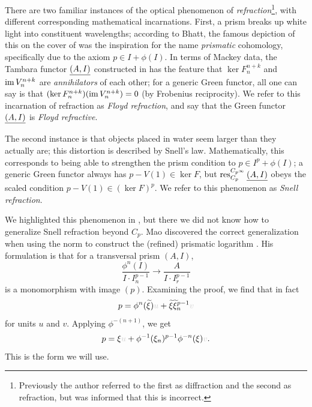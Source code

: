 \begin{remark}[Refraction]
  \label{rmk:snell}
  There are two familiar instances of the optical phenomenon of \emph{refraction}\footnote{Previously the author referred to the first as diffraction and the second as refraction, but was informed that this is incorrect.}, with different corresponding mathematical incarnations. First, a prism breaks up white light into constituent wavelengths; according to Bhatt, the famous depiction of this on the cover of \cite{DarkSideMoon} was the inspiration for the name \emph{prismatic} cohomology, specifically due to the axiom $p \in I + \phi(I)$. In terms of Mackey data, the Tambara functor $\underline{(A, I)}$ constructed in \cite{PrismsTambara1} has the feature that $\ker F^{n+k}_n$ and $\operatorname{im} V^{n+k}_n$ are \emph{annihilators} of each other; for a generic Green functor, all one can say is that $(\ker F^{n+k}_n)(\operatorname{im} V^{n+k}_n) = 0$ (by Frobenius reciprocity). We refer to this incarnation of refraction as \emph{Floyd refraction}, and say that the Green functor $\underline{(A, I)}$ is \emph{Floyd refractive}.

  The second instance is that objects placed in water seem larger than they actually are; this distortion is described by Snell's law. Mathematically, this corresponds to being able to strengthen the prism condition to $p \in I^p + \phi(I)$; a generic Green functor always has $p - V(1) \in \ker F$, but $\operatorname{res}^{C_{p^\infty}}_{C_p} \underline{(A, I)}$ obeys the scaled condition $p-V(1) \in (\ker F)^p$. We refer to this phenomenon as \emph{Snell refraction}.

  We highlighted this phenomenon in \cite{PrismsTambara1}, but there we did not know how to generalize Snell refraction beyond $C_p$. Mao discovered the correct generalization when using the norm to construct the (refined) prismatic logarithm \cite[Lemma 2.1]{MaoLogarithm}. His formulation is that for a transversal prism $(A, I)$,
  \[ \frac{\phi^n(I)}{I \cdot I^{p-1}_n} \to \frac{A}{I \cdot I_r^{p-1} } \]
  is a monomorphism with image $(p)$. Examining the proof, we find that in fact
  \[ p = \phi^n(\~\xi)\fade u + \~\xi \~\xi_n^{p-1}\fade v \]
  for units $u$ and $v$. Applying $\phi^{-(n+1)}$, we get
  \begin{equation}
    \label{eq:snell-polygonic}
    p = \xi \fade u + \phi^{-1}(\xi_n)^{p-1} \phi^{-n}(\xi) \fade v.
  \end{equation}
  This is the form we will use.
\end{remark}

